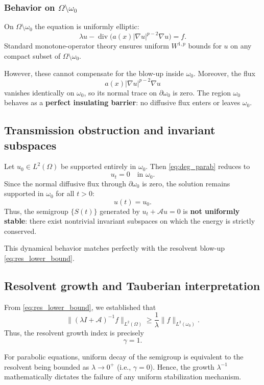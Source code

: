 \documentclass[11pt,reqno]{amsart}
\theoremstyle{remark}
\begin{document}
\subsubsection{Behavior on $\Omega\setminus\omega_0$}

On $\Omega\setminus\omega_0$ the equation is uniformly elliptic:
\[
\lambda u - \operatorname{div}\!\bigl(a(x)|\nabla u|^{p-2}\nabla u\bigr)
   = f.
\]
Standard monotone-operator theory ensures uniform $W^{1,p}$ bounds for $u$
on any compact subset of $\Omega\setminus\omega_0$.

However, these cannot compensate for the blow-up inside $\omega_0$.
Moreover, the flux
\[
a(x)|\nabla u|^{p-2}\nabla u
\]
vanishes identically on $\omega_0$, so its normal trace on $\partial\omega_0$
is zero. The region $\omega_0$ behaves as a \textbf{perfect insulating barrier}:
no diffusive flux enters or leaves $\omega_0$.

\subsection{Transmission obstruction and invariant subspaces}

Let $u_0\in L^2(\Omega)$ be supported entirely in $\omega_0$.
Then \eqref{eq:deg_parab} reduces to
\[
u_t=0 \quad\text{in }\omega_0.
\]
Since the normal diffusive flux through $\partial\omega_0$ is zero,
the solution remains supported in $\omega_0$ for all $t>0$:
\[
u(t)=u_0.
\]
Thus, the semigroup $\{S(t)\}$ generated by $u_t+\mathcal{A}u=0$
is \textbf{not uniformly stable}: there exist nontrivial invariant subspaces
on which the energy is strictly conserved.

This dynamical behavior matches perfectly with the resolvent blow-up \eqref{eq:res_lower_bound}.

\subsection{Resolvent growth and Tauberian interpretation}

From \eqref{eq:res_lower_bound}, we established that
\[
\|(\lambda I+\mathcal{A})^{-1}f\|_{L^2(\Omega)}
 \ge \frac{1}{\lambda}\|f\|_{L^2(\omega_0)}.
\]
Thus, the resolvent growth index is precisely
\[
\gamma = 1.
\]

For parabolic equations, uniform decay of the semigroup is equivalent to the resolvent being bounded as $\lambda\to 0^+$ (i.e., $\gamma=0$).
Hence, the growth $\lambda^{-1}$ mathematically dictates the failure of any uniform stabilization mechanism.
\end{document}
